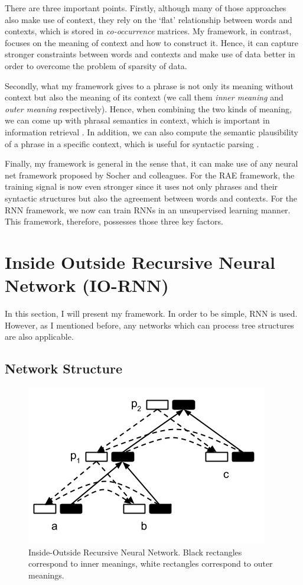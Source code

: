 \documentclass[10pt]{article}
\begin{document}
There are three important points. Firstly, although many of those approaches also make use 
of context, they rely on the `flat' relationship between words and contexts, which is stored in
\textit{co-occurrence} matrices. My framework, in contrast, focuses on the meaning 
of context and how to construct it. Hence, it can capture stronger constraints between 
words and contexts and make use of data better in order to overcome the problem of 
sparsity of data.

Secondly, what my framework gives to a phrase is not only its meaning without context
but also the meaning of its context (we call them \textit{inner meaning} and 
\textit{outer meaning} respectively).
Hence, when combining the two kinds of meaning, 
we can come up with phrasal semantics in context, which is important in information
retrieval \citep{korkontzelos2013semeval}. In addition, we can also compute the 
semantic plausibility of a phrase in a specific context, which is useful for syntactic parsing
\citep{lazaridou2013fish}.

Finally, my framework is general in the sense that, it can make use of 
any neural net framework proposed by Socher and colleagues. For the RAE framework, 
the training signal 
is now even stronger since it uses not only phrases and their syntactic structures but also the 
agreement between words and contexts. For the RNN framework, we now can train RNNs 
in an unsupervised learning manner. 
This framework, therefore, possesses those three key factors.

\section{Inside Outside Recursive Neural Network (IO-RNN)}
\label{section iornn}
In this section, I will present my framework. In order to be simple, RNN is used. 
However, as I mentioned before, any networks which can process tree structures 
are also applicable. 

\subsection{Network Structure}
\begin{figure}[h!]
	\center
	\includegraphics[scale=0.5]{IO-RNN.png}
	\caption{Inside-Outside Recursive Neural Network. Black rectangles correspond to inner meanings, 
	white rectangles correspond to outer meanings.}
	\label{figure iornn}
\end{figure}
\end{document}

